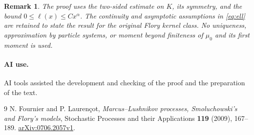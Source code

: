 \documentclass[11pt]{article}
\newtheorem{remark}[theorem]{Remark}
\begin{document}
\begin{remark}
The proof uses the two-sided estimate on $K$, its symmetry, and the bound $0\le\ell(x)\le Cx^\alpha$. The continuity and asymptotic assumptions in \eqref{eq:ell} are retained to state the result for the original Flory kernel class. No uniqueness, approximation by particle systems, or moment beyond finiteness of $\mu_0$ and its first moment is used.
\end{remark}

\paragraph{AI use.} AI tools assisted the development and checking of the proof and the preparation of the text.

\begin{thebibliography}{9}
 N. Fournier and P. Lauren\c{c}ot,
\emph{Marcus--Lushnikov processes, Smoluchowski's and Flory's models},
Stochastic Processes and their Applications \textbf{119} (2009), 167--189.
\href{https://arxiv.org/abs/0706.2057v1}{arXiv:0706.2057v1}.
\end{thebibliography}
\end{document}
